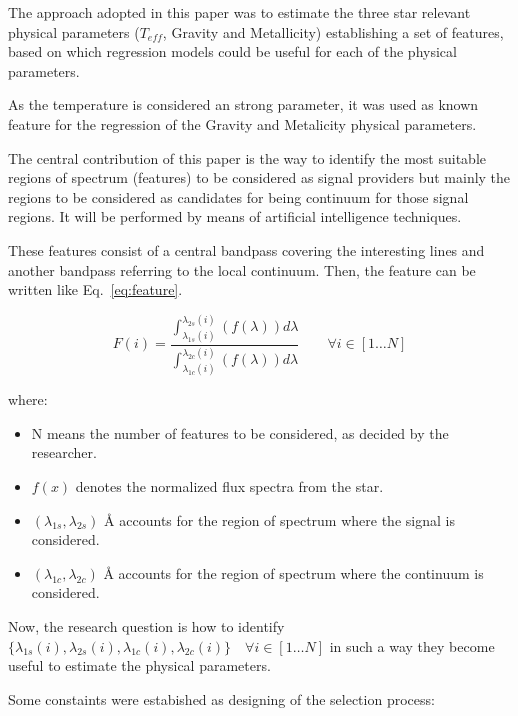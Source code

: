 {
The approach adopted in this paper was to estimate the three star relevant physical 
parameters ($T_{eff}$, Gravity and Metallicity) establishing a set of features, based on which
regression models could be useful for each of the physical parameters.

As the temperature is considered an strong parameter, it was used as known feature 
for the regression of the Gravity and Metalicity physical parameters.

The central contribution of this paper is the way to identify the most suitable
regions of spectrum (features) to be considered as signal providers 
but mainly the regions to be considered 
as candidates for being continuum for those signal regions.
It will be performed by means of artificial intelligence techniques.

These features consist of
a central bandpass covering the interesting lines and another bandpass
referring to the local continuum. Then, the feature can be written like 
Eq.~\eqref{eq:feature}.

\begin{equation}\label{eq:feature}
  F(i) =  \frac{ \int_{\lambda_{1s}(i)}^{\lambda_{2s}(i)} \left(f(\lambda)\right) d{\lambda}}
               { \int_{\lambda_{1c}(i)}^{\lambda_{2c}(i)} \left(f(\lambda)\right) d{\lambda}} 
               \quad \quad \forall i \in [1 \ldots N]
\end{equation}


where:
\begin{itemize}
 \item {N means the number of features to be considered, as decided by the researcher.}
 \item {$f(x)$ denotes the normalized flux spectra from the star.}
 \item {$(\lambda_{1s},\lambda_{2s})$ {\AA} accounts for the region of spectrum where the signal is considered. \quad \label{eq:cons1}}
 \item {$(\lambda_{1c},\lambda_{2c})$ {\AA} accounts for the region of spectrum where the continuum is considered.}
\end{itemize}

{
Now, the research question is how to identify 
$\{\lambda_{1s}(i),\lambda_{2s}(i), \lambda_{1c}(i),\lambda_{2c}(i)\}  \quad \forall i \in [1 \ldots N] $
in such a way they become useful to estimate the physical parameters.

Some constaints were estabished as designing of the selection process:

}}
